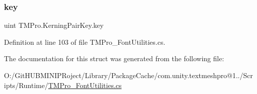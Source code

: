 \mbox{\label{struct_t_m_pro_1_1_kerning_pair_key_a9ba9b62f109bdd654184598abe65cb52}} 
\subsubsection{\texorpdfstring{key}{key}}
{\footnotesize\ttfamily uint T\+M\+Pro.\+Kerning\+Pair\+Key.\+key}



Definition at line 103 of file T\+M\+Pro\+\_\+\+Font\+Utilities.\+cs.



The documentation for this struct was generated from the following file\+:\begin{DoxyCompactItemize}
\item 
O\+:/\+Git\+H\+U\+B\+M\+I\+N\+I\+P\+Roject/\+Library/\+Package\+Cache/com.\+unity.\+textmeshpro@1../\+Scripts/\+Runtime/\mbox{\hyperlink{_t_m_pro___font_utilities_8cs}{T\+M\+Pro\+\_\+\+Font\+Utilities.\+cs}}\end{DoxyCompactItemize}
